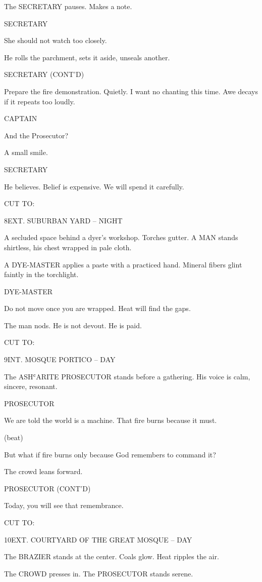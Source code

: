 \documentclass[12pt]{article}
\newlength{\charindent}
\newlength{\dialogueindent}
\newlength{\dialoguewidth}
\newlength{\transitionindent}
\newlength{\parentheticalindent}
\newcommand{\slug}[1]{%
  \needspace{4\baselineskip}%
  \vspace{1.5em}%
  \noindent\MakeUppercase{#1}%
  \nopagebreak[4]%
  \par\vspace{0.75em}%
}
\newcommand{\action}[1]{%
  \noindent#1\par\vspace{0.75em}%
}
\newcommand{\character}[1]{%
  \needspace{3\baselineskip}%
  \par\vspace{0.5em}%
  \noindent\hspace*{\charindent}\MakeUppercase{#1}\nopagebreak[4]%
}
\newcommand{\parenthetical}[1]{%
  \par\nobreak\nopagebreak[4]%
  \noindent\hspace*{\parentheticalindent}(#1)%
}
\newcommand{\dialogue}[1]{%
  \par\nobreak\nopagebreak[4]%
  \noindent\hspace*{\dialogueindent}%
  \begin{minipage}[t]{\dialoguewidth}
  #1
  \end{minipage}%
  \par\vspace{0.5em}%
}
\newcommand{\transition}[1]{%
  \needspace{2\baselineskip}%
  \par\vspace{1em}%
  \noindent\hspace*{\transitionindent}\MakeUppercase{#1}%
  \par%
}
\newcommand{\contd}{\textsc{(cont'd)}}
\newcommand{\beat}{\parenthetical{beat}}
\begin{document}
\action{The SECRETARY pauses. Makes a note.}

\character{SECRETARY}
\dialogue{She should not watch too closely.}

\action{He rolls the parchment, sets it aside, unseals another.}

\character{SECRETARY \contd}
\dialogue{Prepare the fire demonstration. Quietly. I want no chanting this time. Awe decays if it repeats too loudly.}

\character{CAPTAIN}
\dialogue{And the Prosecutor?}

\action{A small smile.}

\character{SECRETARY}
\dialogue{He believes. Belief is expensive. We will spend it carefully.}

\transition{CUT TO:}

\slug{8\quad EXT. SUBURBAN YARD -- NIGHT}

\action{A secluded space behind a dyer’s workshop. Torches gutter. A MAN stands shirtless, his chest wrapped in pale cloth.}

\action{A DYE-MASTER applies a paste with a practiced hand. Mineral fibers glint faintly in the torchlight.}

\character{DYE-MASTER}
\dialogue{Do not move once you are wrapped. Heat will find the gaps.}

\action{The man nods. He is not devout. He is paid.}

\transition{CUT TO:}

\slug{9\quad INT. MOSQUE PORTICO -- DAY}

\action{The ASHʿARITE PROSECUTOR stands before a gathering. His voice is calm, sincere, resonant.}

\character{PROSECUTOR}
\dialogue{We are told the world is a machine. That fire burns because it must.}

\beat

\dialogue{But what if fire burns only because God remembers to command it?}

\action{The crowd leans forward.}

\character{PROSECUTOR \contd}
\dialogue{Today, you will see that remembrance.}

\transition{CUT TO:}

\slug{10\quad EXT. COURTYARD OF THE GREAT MOSQUE -- DAY}

\action{The BRAZIER stands at the center. Coals glow. Heat ripples the air.}

\action{The CROWD presses in. The PROSECUTOR stands serene.}
\end{document}
